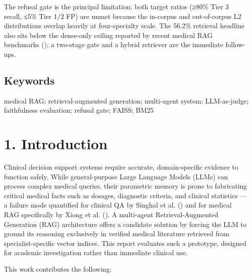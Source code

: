 \documentclass[
  american,
  a4paper,
]{article}
\begin{document}
The refusal gate is the principal limitation: both target ratios (≥80\%
Tier 3 recall, ≤5\% Tier 1/2 FP) are unmet because the in-corpus and
out-of-corpus L2 distributions overlap heavily at four-specialty scale.
The 56.2\% retrieval headline also sits below the dense-only ceiling
reported by recent medical RAG benchmarks
(); a two-stage gate
and a hybrid retriever are the immediate follow-ups.

\subsection{Keywords}\label{keywords}

medical RAG; retrieval-augmented generation; multi-agent system;
LLM-as-judge; faithfulness evaluation; refusal gate; FAISS; BM25

\section{1. Introduction}\label{introduction}

Clinical decision support systems require accurate, domain-specific
evidence to function safely. While general-purpose Large Language Models
(LLMs) can process complex medical queries, their parametric memory is
prone to fabricating critical medical facts such as dosages, diagnostic
criteria, and clinical statistics --- a failure mode quantified for
clinical QA by Singhal et al. ()
and for medical RAG specifically by Xiong et al.
(). A multi-agent
Retrieval-Augmented Generation (RAG) architecture offers a candidate
solution by forcing the LLM to ground its reasoning exclusively in
verified medical literature retrieved from specialist-specific vector
indices. This report evaluates such a prototype, designed for academic
investigation rather than immediate clinical use.

This work contributes the following:
\end{document}
